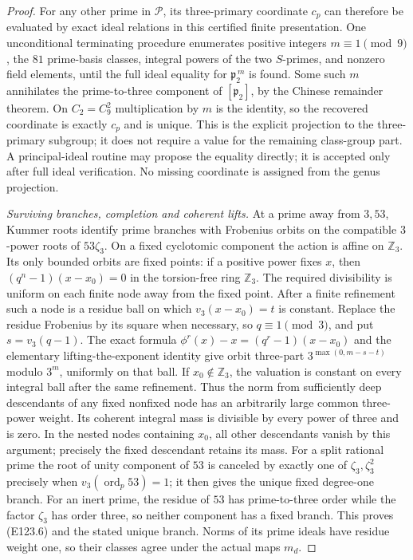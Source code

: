 \begin{proof}
For any other prime in $\mathcal P$, its three-primary coordinate
$c_p$ can therefore be evaluated by exact ideal relations in this
certified finite presentation. One unconditional terminating
procedure enumerates positive integers $m\equiv1\pmod9$, the $81$
prime-basis classes, integral powers of the two $S$-primes, and
nonzero field elements, until the full ideal equality for
$\mathfrak p_2^{\,m}$ is found. Some such $m$ annihilates the
prime-to-three component of $[\mathfrak p_2]$, by the Chinese
remainder theorem. On $C_2=C_9^2$ multiplication by $m$ is the
identity, so the recovered coordinate is exactly $c_p$ and is
unique. This is the explicit projection to the three-primary
subgroup; it does not require a value for the remaining class-group
part. A principal-ideal routine may propose the equality directly;
it is accepted only after full ideal verification. No missing
coordinate is assigned from the genus projection.

\emph{Surviving branches, completion and coherent lifts.}
At a prime away from $3,53$, Kummer roots identify prime branches
with Frobenius orbits on the compatible $3$-power roots of
$53\zeta_3$. On a fixed cyclotomic component the action is affine
on $\mathbb Z_3$. Its only bounded orbits are fixed points:
if a positive power fixes $x$, then
$(q^n-1)(x-x_0)=0$ in the torsion-free ring $\mathbb Z_3$.
The required divisibility is uniform on each finite node away
from the fixed point. After a finite refinement such a node is
a residue ball on which $v_3(x-x_0)=t$ is constant.
Replace the residue Frobenius by its square when necessary, so
$q\equiv1\pmod3$, and put $s=v_3(q-1)$.
The exact formula
$\phi^r(x)-x=(q^r-1)(x-x_0)$ and the elementary lifting-the-exponent
identity give orbit three-part
$3^{\max(0,m-s-t)}$ modulo $3^m$, uniformly on that ball.
If $x_0\notin\mathbb Z_3$, the valuation is constant on every
integral ball after the same refinement.
Thus the norm from sufficiently deep descendants of any fixed
nonfixed node has an arbitrarily large common three-power weight.
Its coherent integral mass is divisible by every power of three
and is zero. In the nested nodes containing $x_0$, all other
descendants vanish by this argument; precisely the fixed descendant
retains its mass.
For a split rational prime the root of unity component of $53$
is canceled by exactly one of $\zeta_3,\zeta_3^2$ precisely when
$v_3(\operatorname{ord}_p53)=1$; it then gives the unique fixed
degree-one branch. For an inert prime, the residue of $53$
has prime-to-three order while the factor $\zeta_3$ has order
three, so neither component has a fixed branch.
This proves (E123.6) and the stated unique branch.
Norms of its prime ideals have residue weight one, so their
classes agree under the actual maps $m_d$.


\end{proof}
